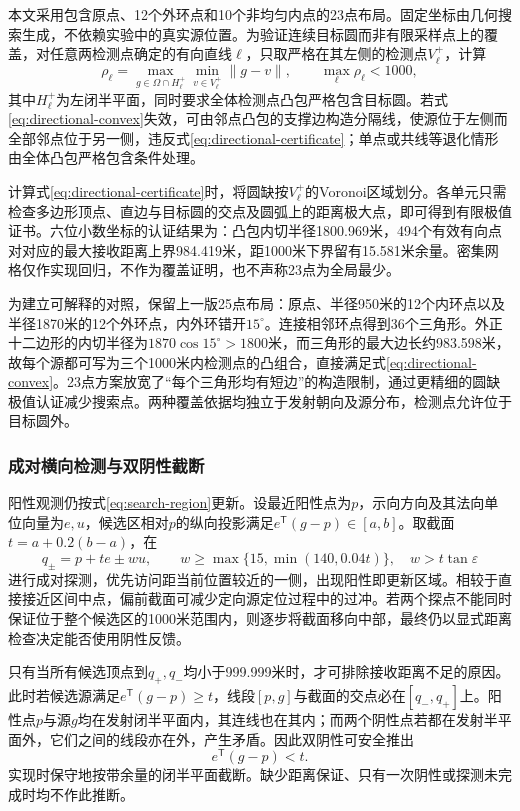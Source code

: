 \documentclass{JXUSTmodeling}
\begin{document}
本文采用包含原点、12个外环点和10个非均匀内点的23点布局。固定坐标由几何搜索生成，不依赖实验中的真实源位置。为验证连续目标圆而非有限采样点上的覆盖，对任意两检测点确定的有向直线$\ell$，只取严格在其左侧的检测点$V_\ell^+$，计算
\begin{equation}
 \rho_\ell=\max_{g\in\Omega\cap H_\ell^+}
             \min_{v\in V_\ell^+}\|g-v\|,
 \qquad \max_\ell\rho_\ell<1000,
 \label{eq:directional-certificate}
\end{equation}
其中$H_\ell^+$为左闭半平面，同时要求全体检测点凸包严格包含目标圆。若式\eqref{eq:directional-convex}失效，可由邻点凸包的支撑边构造分隔线，使源位于左侧而全部邻点位于另一侧，违反式\eqref{eq:directional-certificate}；单点或共线等退化情形由全体凸包严格包含条件处理。

计算式\eqref{eq:directional-certificate}时，将圆缺按$V_\ell^+$的Voronoi区域划分\cite{deberg2008}。各单元只需检查多边形顶点、直边与目标圆的交点及圆弧上的距离极大点，即可得到有限极值证书。六位小数坐标的认证结果为：凸包内切半径1800.969米，494个有效有向点对对应的最大接收距离上界984.419米，距1000米下界留有15.581米余量。密集网格仅作实现回归，不作为覆盖证明，也不声称23点为全局最少。

为建立可解释的对照，保留上一版25点布局：原点、半径950米的12个内环点以及半径1870米的12个外环点，内外环错开$15^\circ$。连接相邻环点得到36个三角形。外正十二边形的内切半径为$1870\cos15^\circ>1800$米，而三角形的最大边长约983.598米，故每个源都可写为三个1000米内检测点的凸组合，直接满足式\eqref{eq:directional-convex}。23点方案放宽了“每个三角形均有短边”的构造限制，通过更精细的圆缺极值认证减少搜索点。两种覆盖依据均独立于发射朝向及源分布，检测点允许位于目标圆外。

\subsubsection{成对横向检测与双阴性截断}
阳性观测仍按式\eqref{eq:search-region}更新。设最近阳性点为$p$，示向方向及其法向单位向量为$e,u$，候选区相对$p$的纵向投影满足$e^{\mathsf T}(g-p)\in[a,b]$。取截面$t=a+0.2(b-a)$，在
\begin{equation}
 q_\pm=p+te\pm wu,\qquad
 w\ge\max\{15,\min(140,0.04t)\},\quad w>t\tan\varepsilon
 \label{eq:paired-probe}
\end{equation}
进行成对探测，优先访问距当前位置较近的一侧，出现阳性即更新区域。相较于直接接近区间中点，偏前截面可减少定向源定位过程中的过冲。若两个探点不能同时保证位于整个候选区的1000米范围内，则逐步将截面移向中部，最终仍以显式距离检查决定能否使用阴性反馈。

只有当所有候选顶点到$q_+,q_-$均小于999.999米时，才可排除接收距离不足的原因。此时若候选源满足$e^{\mathsf T}(g-p)\ge t$，线段$[p,g]$与截面的交点必在$[q_-,q_+]$上。阳性点$p$与源$g$均在发射闭半平面内，其连线也在其内；而两个阴性点若都在发射半平面外，它们之间的线段亦在外，产生矛盾。因此双阴性可安全推出
\begin{equation}
 e^{\mathsf T}(g-p)<t.
 \label{eq:paired-negative}
\end{equation}
实现时保守地按带余量的闭半平面截断。缺少距离保证、只有一次阴性或探测未完成时均不作此推断。
\end{document}
